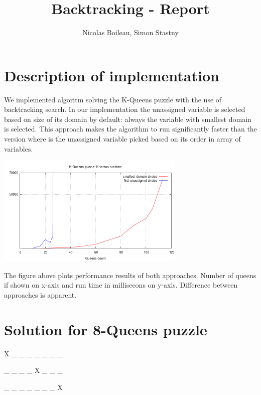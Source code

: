 \documentclass{article}
\begin{document}
\providecommand{\abs}[1]{\lvert#1\rvert}

\title{Backtracking - Report}
\author{Nicolas Boileau, Simon Stastny}

\maketitle

\section{Description of implementation}

We implemented algoritm solving the K-Queens puzzle with the use of backtracking
search. In our implementation the unassigned variable is selected based on size
of its domain by default: always the variable with smallest domain is selected.
This approach makes the algorithm to run significantly faster than the version
where is the unassigned variable picked based on its order in array of variables.


\includegraphics[width=340,height=200]{plot/queens.png}

The figure above plots performance results of both approaches. Number of
queens if shown on x-axis and run time in millisecons on y-axis. Difference between
approaches is apparent.

\newpage

\section{Solution for 8-Queens puzzle}

X \_ \_ \_ \_ \_ \_ \_ 

\_ \_ \_ \_ X \_ \_ \_ 

\_ \_ \_ \_ \_ \_ \_ X 
\end{document}
